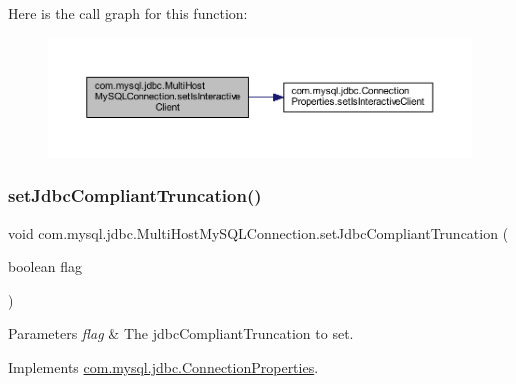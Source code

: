 Here is the call graph for this function\+:
\nopagebreak
\begin{figure}[H]
\begin{center}
\leavevmode
\includegraphics[width=350pt]{classcom_1_1mysql_1_1jdbc_1_1_multi_host_my_s_q_l_connection_ae0dcc145ddb08238e1cc8af9139af39f_cgraph}
\end{center}
\end{figure}
\mbox{\label{classcom_1_1mysql_1_1jdbc_1_1_multi_host_my_s_q_l_connection_a21f38ef972c4b59de2b93cdc7549d634}} 
\subsubsection{\texorpdfstring{set\+Jdbc\+Compliant\+Truncation()}{setJdbcCompliantTruncation()}}
{\footnotesize\ttfamily void com.\+mysql.\+jdbc.\+Multi\+Host\+My\+S\+Q\+L\+Connection.\+set\+Jdbc\+Compliant\+Truncation (\begin{DoxyParamCaption}\item[{boolean}]{flag }\end{DoxyParamCaption})}


\begin{DoxyParams}{Parameters}
{\em flag} & The jdbc\+Compliant\+Truncation to set. \\
\hline
\end{DoxyParams}


Implements \mbox{\hyperlink{interfacecom_1_1mysql_1_1jdbc_1_1_connection_properties_aa770c64e002c6ab1cb335107d0380476}{com.\+mysql.\+jdbc.\+Connection\+Properties}}.

